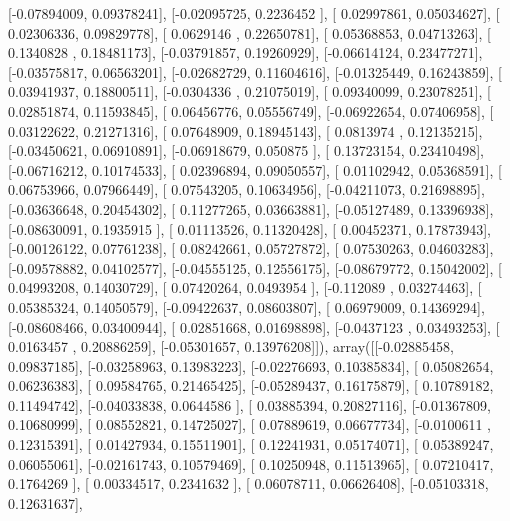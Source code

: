 \documentclass{article}
\begin{document}
       [-0.07894009,  0.09378241],
       [-0.02095725,  0.2236452 ],
       [ 0.02997861,  0.05034627],
       [ 0.02306336,  0.09829778],
       [ 0.0629146 ,  0.22650781],
       [ 0.05368853,  0.04713263],
       [ 0.1340828 ,  0.18481173],
       [-0.03791857,  0.19260929],
       [-0.06614124,  0.23477271],
       [-0.03575817,  0.06563201],
       [-0.02682729,  0.11604616],
       [-0.01325449,  0.16243859],
       [ 0.03941937,  0.18800511],
       [-0.0304336 ,  0.21075019],
       [ 0.09340099,  0.23078251],
       [ 0.02851874,  0.11593845],
       [ 0.06456776,  0.05556749],
       [-0.06922654,  0.07406958],
       [ 0.03122622,  0.21271316],
       [ 0.07648909,  0.18945143],
       [ 0.0813974 ,  0.12135215],
       [-0.03450621,  0.06910891],
       [-0.06918679,  0.050875  ],
       [ 0.13723154,  0.23410498],
       [-0.06716212,  0.10174533],
       [ 0.02396894,  0.09050557],
       [ 0.01102942,  0.05368591],
       [ 0.06753966,  0.07966449],
       [ 0.07543205,  0.10634956],
       [-0.04211073,  0.21698895],
       [-0.03636648,  0.20454302],
       [ 0.11277265,  0.03663881],
       [-0.05127489,  0.13396938],
       [-0.08630091,  0.1935915 ],
       [ 0.01113526,  0.11320428],
       [ 0.00452371,  0.17873943],
       [-0.00126122,  0.07761238],
       [ 0.08242661,  0.05727872],
       [ 0.07530263,  0.04603283],
       [-0.09578882,  0.04102577],
       [-0.04555125,  0.12556175],
       [-0.08679772,  0.15042002],
       [ 0.04993208,  0.14030729],
       [ 0.07420264,  0.0493954 ],
       [-0.112089  ,  0.03274463],
       [ 0.05385324,  0.14050579],
       [-0.09422637,  0.08603807],
       [ 0.06979009,  0.14369294],
       [-0.08608466,  0.03400944],
       [ 0.02851668,  0.01698898],
       [-0.0437123 ,  0.03493253],
       [ 0.0163457 ,  0.20886259],
       [-0.05301657,  0.13976208]]), array([[-0.02885458,  0.09837185],
       [-0.03258963,  0.13983223],
       [-0.02276693,  0.10385834],
       [ 0.05082654,  0.06236383],
       [ 0.09584765,  0.21465425],
       [-0.05289437,  0.16175879],
       [ 0.10789182,  0.11494742],
       [-0.04033838,  0.0644586 ],
       [ 0.03885394,  0.20827116],
       [-0.01367809,  0.10680999],
       [ 0.08552821,  0.14725027],
       [ 0.07889619,  0.06677734],
       [-0.0100611 ,  0.12315391],
       [ 0.01427934,  0.15511901],
       [ 0.12241931,  0.05174071],
       [ 0.05389247,  0.06055061],
       [-0.02161743,  0.10579469],
       [ 0.10250948,  0.11513965],
       [ 0.07210417,  0.1764269 ],
       [ 0.00334517,  0.2341632 ],
       [ 0.06078711,  0.06626408],
       [-0.05103318,  0.12631637],
\end{document}
